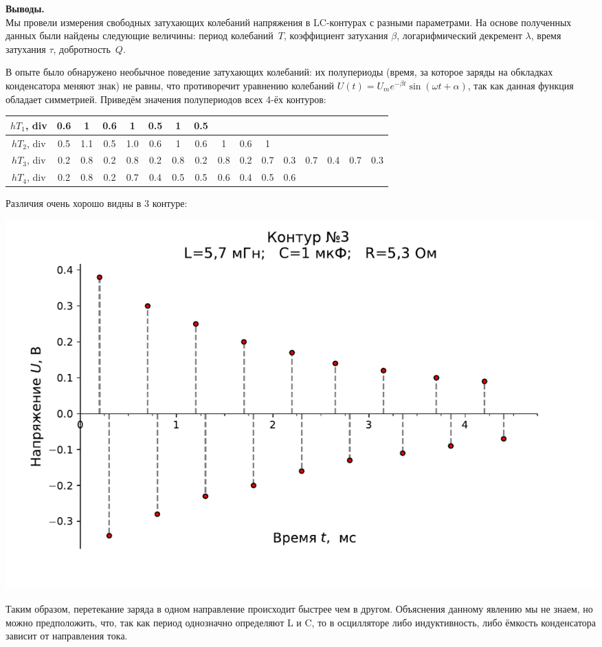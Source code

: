 \documentclass[ a4paper]{article}
\begin{document}
{\parindent=0pt\textbf{Выводы.}}\\
Мы провели измерения свободных затухающих колебаний напряжения в LC-контурах с разными параметрами. 
На основе полученных данных были найдены следующие величины: период колебаний~$T$, коэффициент затухания $\beta$, 
логарифмический декремент $\lambda$, время затухания $\tau$, добротность~$Q$.

В опыте было обнаружено необычное  поведение затухающих колебаний: их полупериоды (время, за которое заряды на обкладках конденсатора меняют знак) 
не равны, что противоречит уравнению колебаний $U(t)=U_me^{-\beta t}\sin(\omega t + \alpha)$, так как данная функция обладает симметрией. 
Приведём значения полупериодов всех 4-ёх контуров:
\begin{center}
	\begin{tabular}{|c|c|c|c|c|c|c|c|c|c|c|c|c|c|c|c|}
		\hline
		$hT_1$, div&  0.6& 1 & 0.6& 1 & 0.5& 1 & 0.5& & & & & & && \\
		\hline
		$hT_2$, div&  0.5& 1.1& 0.5& 1.0 & 0.6& 1 & 0.6& 1 & 0.6& 1 & & & && \\
		\hline
		$hT_3$, div& 0.2& 0.8& 0.2& 0.8& 0.2& 0.8& 0.2& 0.8& 0.2& 0.7& 0.3& 0.7& 0.4& 0.7& 0.3 \\
		\hline
		$hT_4$, div&0.2& 0.8& 0.2& 0.7& 0.4& 0.5& 0.5& 0.6& 0.4& 0.5& 0.6& & & &\\
		\hline
	\end{tabular}
\end{center}

Различия очень хорошо видны в 3 контуре:
\begin{center}
	\includegraphics[scale=0.7]{pic.pdf}
	\end{center}
Таким образом, перетекание заряда в одном направление происходит быстрее чем в другом. 
Объяснения данному явлению мы не знаем, но можно предположить, что, так как период однозначно определяют L и C, то 
в осцилляторе либо  индуктивность, либо ёмкость конденсатора зависит от направления тока.
	
\end{document}
